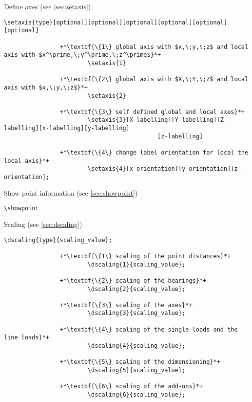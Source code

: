 \documentclass[%
  a4paper,
  BCOR20mm,
  pointlessnumbers,
  twoside,
  halfparskip,
  openright,
]{scrreprt}
\begin{document}
Define axes (see \ref{sec:setaxis})

\begin{lstlisting}[emph={setaxis},backgroundcolor=\color{white}]
		\setaxis{type}[optional][optional][optional][optional][optional][optional]
		
				+*\textbf{\{1\} global axis with $x,\;y,\;z$ and local axis with $x^\prime,\;y^\prime,\;z^\prime$}*+
						\setaxis{1}
						
				+*\textbf{\{2\} global axis with $X,\;Y,\;Z$ and local axis with $x,\;y,\;z$}*+
						\setaxis{2}
						
				+*\textbf{\{3\} self defined global and local axes}*+
						\setaxis{3}[X-labelling][Y-labelling][Z-labelling][x-labelling][y-labelling]
											[z-labelling]
						
				+*\textbf{\{4\} change label orientation for local the local axis}*+
						\setaxis{4}[x-orientation][y-orientation][z-orientation];										
\end{lstlisting}\vspace{-10mm}

Show point information (see \ref{sec:showpoint})

\begin{lstlisting}[emph={showpoint},backgroundcolor=\color{white}]
		\showpoint
\end{lstlisting}\vspace{-10mm}

Scaling (see \ref{sec:dscaling})

\begin{lstlisting}[emph={dscaling},backgroundcolor=\color{white}]
		\dscaling{type}{scaling_value};
		
				+*\textbf{\{1\} scaling of the point distances}*+
						\dscaling{1}{scaling_value};
						
				+*\textbf{\{2\} scaling of the bearings}*+
						\dscaling{2}{scaling_value};
						
				+*\textbf{\{3\} scaling of the axes}*+
						\dscaling{3}{scaling_value};
						
				+*\textbf{\{4\} scaling of the single loads and the line loads}*+
						\dscaling{4}{scaling_value};
						
				+*\textbf{\{5\} scaling of the dimensioning}*+
						\dscaling{5}{scaling_value};
						
				+*\textbf{\{6\} scaling of the add-ons}*+
						\dscaling{6}{scaling_value};
\end{lstlisting}\vspace{-10mm}
\end{document}
